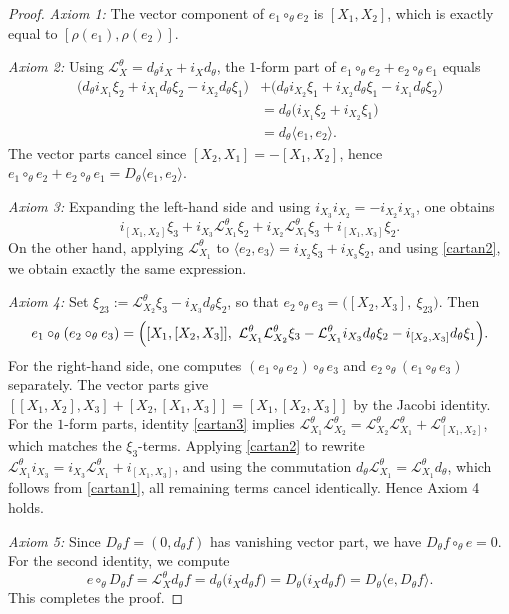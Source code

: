 \documentclass[10pt,a4paper]{amsart}
\begin{document}
\begin{proof}
\textit{Axiom 1:} The vector component of $e_1\circ_\theta e_2$ is $[X_1,X_2]$, which is exactly equal to $[\rho(e_1),\rho(e_2)]$.

\smallskip
\textit{Axiom 2:} Using $\mathcal{L}^\theta_X = d_{\theta} i_X + i_X d_{\theta}$, the $1$-form part of
$e_1\circ_\theta e_2 + e_2\circ_\theta e_1$ equals
\begin{align*}
	\bigl(d_{\theta} i_{X_1}\xi_2 + i_{X_1}d_{\theta}\xi_2 - i_{X_2}d_{\theta}\xi_1\bigr)
	&+ \bigl(d_{\theta} i_{X_2}\xi_1 + i_{X_2}d_{\theta}\xi_1 - i_{X_1}d_{\theta}\xi_2\bigr)\\
	&= d_{\theta}\bigl(i_{X_1}\xi_2 + i_{X_2}\xi_1\bigr)\\
	&= d_{\theta}\langle e_1,e_2\rangle.
\end{align*}
The vector parts cancel since $[X_2,X_1]=-[X_1,X_2]$, hence
$e_1\circ_\theta e_2 + e_2\circ_\theta e_1 = D_\theta\langle e_1,e_2\rangle$.

\smallskip
\textit{Axiom 3:} Expanding the left-hand side and using $i_{X_3}i_{X_2}=-i_{X_2}i_{X_3}$, one obtains
$$
i_{[X_1,X_2]}\xi_3 + i_{X_3}\mathcal{L}^\theta_{X_1}\xi_2
+ i_{X_2}\mathcal{L}^\theta_{X_1}\xi_3 + i_{[X_1,X_3]}\xi_2.
$$
On the other hand, applying $\mathcal{L}^\theta_{X_1}$ to
$\langle e_2,e_3\rangle = i_{X_2}\xi_3 + i_{X_3}\xi_2$, and using \eqref{cartan2},
we obtain exactly the same expression.

\smallskip
\textit{Axiom 4:} Set $\xi_{23}:=\mathcal{L}^\theta_{X_2}\xi_3 - i_{X_3}d_{\theta}\xi_2$, so that
$e_2\circ_\theta e_3 = \bigl([X_2,X_3],\ \xi_{23}\bigr)$.
Then
\begin{equation*}
	e_1\circ_\theta (e_2\circ_\theta e_3)
	=
	\Bigl([X_1,[X_2,X_3]],\ \mathcal{L}^\theta_{X_1}\mathcal{L}^\theta_{X_2}\xi_3
	- \mathcal{L}^\theta_{X_1}i_{X_3}d_{\theta}\xi_2
	- i_{[X_2,X_3]}d_{\theta}\xi_1\Bigr).
\end{equation*}
For the right-hand side, one computes $(e_1\circ_\theta e_2)\circ_\theta e_3$ and
$e_2\circ_\theta (e_1\circ_\theta e_3)$ separately.
The vector parts give
$[[X_1,X_2],X_3] + [X_2,[X_1,X_3]] = [X_1,[X_2,X_3]]$ by the Jacobi identity.
For the $1$-form parts, identity \eqref{cartan3} implies
$\mathcal{L}^\theta_{X_1}\mathcal{L}^\theta_{X_2}
= \mathcal{L}^\theta_{X_2}\mathcal{L}^\theta_{X_1}+\mathcal{L}^\theta_{[X_1,X_2]}$,
which matches the $\xi_3$-terms.
Applying \eqref{cartan2} to rewrite
$\mathcal{L}^\theta_{X_1}i_{X_3}
= i_{X_3}\mathcal{L}^\theta_{X_1}+i_{[X_1,X_3]}$,
and using the commutation $d_{\theta}\mathcal{L}^\theta_{X_1}=\mathcal{L}^\theta_{X_1}d_{\theta}$,
which follows from \eqref{cartan1},
all remaining terms cancel identically.
Hence Axiom 4 holds.

\smallskip
\textit{Axiom 5:} Since $D_\theta f=(0,d_{\theta} f)$ has vanishing vector part, we have
$D_\theta f\circ_\theta e=0$.
For the second identity, we compute
$$
e\circ_\theta D_\theta f
= \mathcal{L}^\theta_X d_{\theta} f
= d_{\theta}\bigl(i_X d_{\theta} f\bigr)
= D_\theta\bigl(i_X d_{\theta} f\bigr)
= D_\theta\langle e,D_\theta f\rangle.
$$
This completes the proof.
\end{proof}
\end{document}

